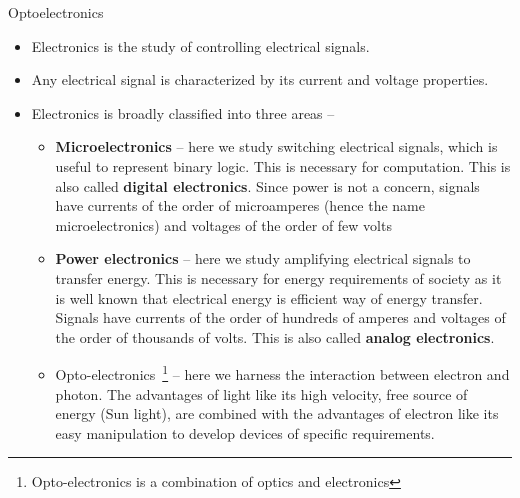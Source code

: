 %
%
\begin{frame}[label=pre-M2T1-slot2]{Optoelectronics}
	\begin{itemize}
		\item Electronics is the study of controlling electrical signals.
		\item Any electrical signal is characterized by its current and voltage properties.
		\item Electronics is broadly classified into three areas --
		\begin{itemize}
			\item \textbf{Microelectronics} -- here we study switching electrical signals, which is useful to represent binary logic. This is necessary for computation. This is also called \textbf{digital electronics}. Since power is not a concern, signals have currents of the order of microamperes (hence the name microelectronics) and voltages of the order of few volts 
			\item \textbf{Power electronics} -- here we study amplifying electrical signals to transfer energy. This is necessary for energy requirements of society as it is well known that electrical energy is efficient way of energy transfer. Signals have currents of the order of hundreds of amperes and voltages of the order of thousands of volts.  This is also called \textbf{analog electronics}.
			\item Opto-electronics~\footnote{Opto-electronics is a combination of optics and electronics} -- here we harness the interaction between electron and photon. The advantages of light like its high velocity, free source of energy (Sun light), are combined with the advantages of electron like its easy manipulation to develop devices of specific requirements. 
		\end{itemize}
	\end{itemize}
\end{frame}
%
